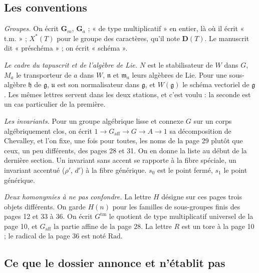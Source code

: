\documentclass[11pt,a4paper]{article}
\begin{document}
\subsection*{Les conventions}

\emph{Groupes.} On écrit $\mathbf{G}_{m}$, $\mathbf{G}_{a}$ ; « de type
multiplicatif » en entier, là où il écrit « t.m. » ; $X^{*}(T)$ pour le groupe
des caractères, qu'il note $\mathbf{D}(T)$. Le manuscrit dit « préschéma » ;
on écrit « schéma ».

\emph{Le cadre du tapuscrit et de l'algèbre de Lie.} $N$ est le stabilisateur
de $W$ dans $G$, $M_{a}$ le transporteur de $a$ dans $W$, $\mathfrak{n}$ et
$\mathfrak{m}_{a}$ leurs algèbres de Lie. Pour une sous-algèbre $\mathfrak{h}$
de $\mathfrak{g}$, $\mathfrak{u}$ est son normalisateur dans $\mathfrak{g}$, et
$W(\mathfrak{g})$ le schéma vectoriel de $\mathfrak{g}$. Les mêmes lettres
servent dans les deux stations, et c'est voulu : la seconde est un cas
particulier de la première.

\emph{Les invariants.} Pour un groupe algébrique lisse et connexe $G$ sur un
corps algébriquement clos, on écrit $1 \to G_{\mathrm{aff}} \to G \to A \to 1$
sa décomposition de Chevalley, et l'on fixe, une fois pour toutes, les noms de
la page 29 plutôt que ceux, un peu différents, des pages 28 et 31. On en donne
la liste au début de la dernière section. Un invariant sans accent se rapporte
à la fibre spéciale, un invariant accentué ($\rho'$, $d'$) à la fibre
générique. $s_{0}$ est le point fermé, $s_{1}$ le point générique.

\emph{Deux homonymies à ne pas confondre.} La lettre $H$ désigne sur ces
pages trois objets différents. On garde $H(n)$ pour les familles de
sous-groupes finis des pages 12 et 33 à 36. On écrit $G^{\mathrm{tm}}$ le
quotient de type multiplicatif universel de la page 10, et $G_{\mathrm{aff}}$
la partie affine de la page 28. La lettre $R$ est un tore à la page 10 ; le
radical de la page 36 est noté $\mathrm{Rad}$.

\subsection*{Ce que le dossier annonce et n'établit pas}
\end{document}

